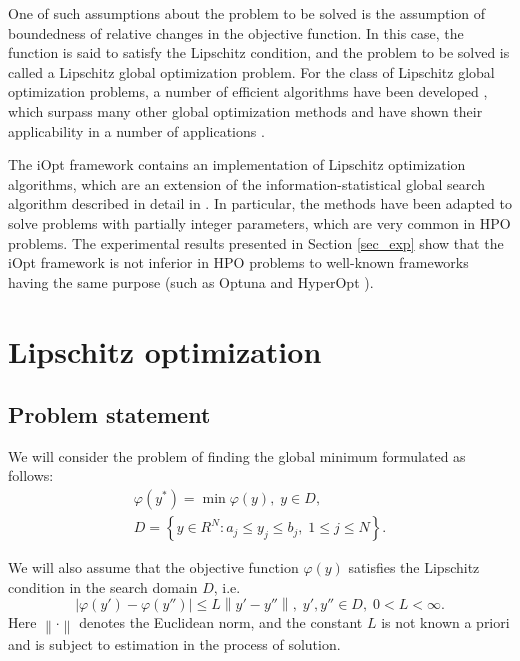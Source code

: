 \documentclass[preprint,12pt]{elsarticle}
\begin{document}
One of such assumptions about the problem to be solved is the assumption of boundedness of relative changes in the objective function. In this case, the function is said to satisfy the Lipschitz condition, and the problem to be solved is called a Lipschitz global optimization problem. For the class of Lipschitz global optimization problems, a number of efficient algorithms have been developed \cite{Jones2021,Paulavicius2020,Strongin2020,Sergeyev2017,PaulaviciusZilinskas2014}, which surpass many other global optimization methods \cite{Sergeyev2018} and have shown their applicability in a number of applications \cite{Kvasov2008,CANDELIERI2019,Gubaydullin2021}.

The iOpt framework contains an implementation of Lipschitz optimization algorithms, which are an extension of the information-statistical global search algorithm described in detail in \cite{Strongin2000,Sergeyev2013}. In particular, the methods have been adapted to solve problems with partially integer parameters, which are very common in HPO problems. The experimental results presented in Section \ref{sec_exp} show that the iOpt framework is not inferior in HPO problems to well-known frameworks having the same purpose (such as Optuna \cite{optuna} and HyperOpt \cite{hyperopt}). 

\section{Lipschitz optimization} 
\label{sec_lip}

\subsection{Problem statement} 

We will consider the problem of finding the global minimum formulated as follows:
\begin{gather}
	\varphi(y^*) = \min \varphi(y), \; y \in D, \label{f_func} \\
	D = \left\{y \in R^N : a_j \leq y_j \leq b_j , \; 1 \leq j \leq N \right\}. \label{f_D}
\end{gather}

We will also assume that the objective function $\varphi(y)$ satisfies the Lipschitz condition in the search domain $D$, i.e.
\begin{equation} \label{f_lip}
	\left| \varphi(y')-\varphi(y'') \right| \leq L\left\| y' - y''  \right\| , \; y',y'' \in D, \; 0<L<\infty.
\end{equation}
Here $ \left\| \cdot \right\|$ denotes the Euclidean norm, and the constant $L$ is not known a priori and is subject to estimation in the process of solution. 
\end{document}
